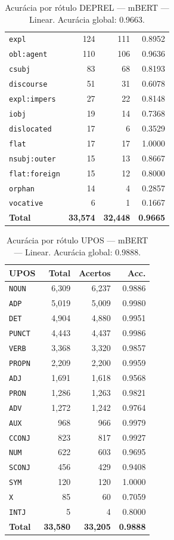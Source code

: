 \begin{table}[ht]
\begin{tabular}{lrrr}
\texttt{expl} & 124 & 111 & 0.8952 \\
\texttt{obl\!:\!agent} & 110 & 106 & 0.9636 \\
\texttt{csubj} & 83 & 68 & 0.8193 \\
\texttt{discourse} & 51 & 31 & 0.6078 \\
\texttt{expl\!:\!impers} & 27 & 22 & 0.8148 \\
\texttt{iobj} & 19 & 14 & 0.7368 \\
\texttt{dislocated} & 17 & 6 & 0.3529 \\
\texttt{flat} & 17 & 17 & 1.0000 \\
\texttt{nsubj\!:\!outer} & 15 & 13 & 0.8667 \\
\texttt{flat\!:\!foreign} & 15 & 12 & 0.8000 \\
\texttt{orphan} & 14 & 4 & 0.2857 \\
\texttt{vocative} & 6 & 1 & 0.1667 \\
\midrule
\textbf{Total} & \textbf{33,574} & \textbf{32,448} & \textbf{0.9665} \\
\bottomrule
\end{tabular}
\caption{Acurácia por rótulo DEPREL — mBERT — Linear. Acurácia global: 0.9663.}
\label{tab:deprel-acc-predict-test-df-mbert-linear}
\end{table}

\begin{table}[ht]
\centering
\footnotesize
\begin{tabular}{lrrr}
\toprule
\textbf{UPOS} & \textbf{Total} & \textbf{Acertos} & \textbf{Acc.} \\
\midrule
\texttt{NOUN} & 6,309 & 6,237 & 0.9886 \\
\texttt{ADP} & 5,019 & 5,009 & 0.9980 \\
\texttt{DET} & 4,904 & 4,880 & 0.9951 \\
\texttt{PUNCT} & 4,443 & 4,437 & 0.9986 \\
\texttt{VERB} & 3,368 & 3,320 & 0.9857 \\
\texttt{PROPN} & 2,209 & 2,200 & 0.9959 \\
\texttt{ADJ} & 1,691 & 1,618 & 0.9568 \\
\texttt{PRON} & 1,286 & 1,263 & 0.9821 \\
\texttt{ADV} & 1,272 & 1,242 & 0.9764 \\
\texttt{AUX} & 968 & 966 & 0.9979 \\
\texttt{CCONJ} & 823 & 817 & 0.9927 \\
\texttt{NUM} & 622 & 603 & 0.9695 \\
\texttt{SCONJ} & 456 & 429 & 0.9408 \\
\texttt{SYM} & 120 & 120 & 1.0000 \\
\texttt{X} & 85 & 60 & 0.7059 \\
\texttt{INTJ} & 5 & 4 & 0.8000 \\
\midrule
\textbf{Total} & \textbf{33,580} & \textbf{33,205} & \textbf{0.9888} \\
\bottomrule
\end{tabular}
\caption{Acurácia por rótulo UPOS — mBERT — Linear. Acurácia global: 0.9888.}
\label{tab:upos-acc-predict-test-df-mbert-linear}
\end{table}
